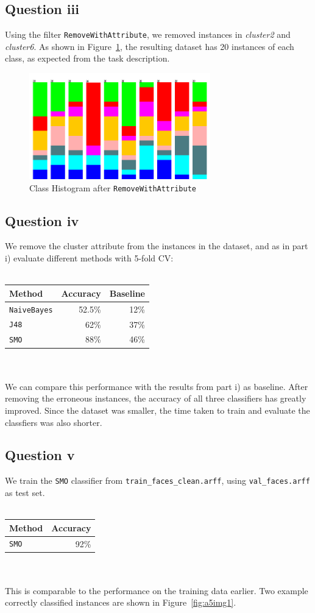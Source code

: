 \documentclass[a4paper]{article}
\begin{document}
\subsection*{Question iii}
Using the filter {\tt RemoveWithAttribute}, we removed instances in {\it cluster2} and {\it cluster6}. As shown in Figure~\ref{fig:a3img1}, the resulting dataset has 20 instances of each class, as expected from the task description.
% 
\begin{figure}[!htbp]
\centering
\includegraphics[width=0.7\textwidth]{A2-img3-remjunk-cropped.png}
\caption{Class Histogram after {\tt RemoveWithAttribute}}
\label{fig:a3img1}
\end{figure}

\subsection*{Question iv}
We remove the cluster attribute from the instances in the dataset, and as in part i) evaluate different methods with 5-fold CV:\\
\\
\begin{tabular}{lrr}
Method & Accuracy & Baseline \\
\hline
{\tt NaiveBayes} & 52.5\% & 12\% \\
{\tt J48} & 62\% & 37\% \\
{\tt SMO} & 88\% & 46\%
\end{tabular}\\
\\
We can compare this performance with the results from part i) as baseline. After removing the erroneous instances, the accuracy of all three classifiers has greatly improved. Since the dataset was smaller, the time taken to train and evaluate the classfiers was also shorter.

\subsection*{Question v}
We train the {\tt SMO} classifier from {\tt train\_faces\_clean.arff}, using {\tt val\_faces.arff} as test set.\\
\\
\begin{tabular}{lr}
Method & Accuracy \\
\hline
{\tt SMO} & 92\%
\end{tabular}\\
\\
This is comparable to the performance on the training data earlier. Two example correctly classified instances are shown in Figure~\ref{fig:a5img1}.
\end{document}
